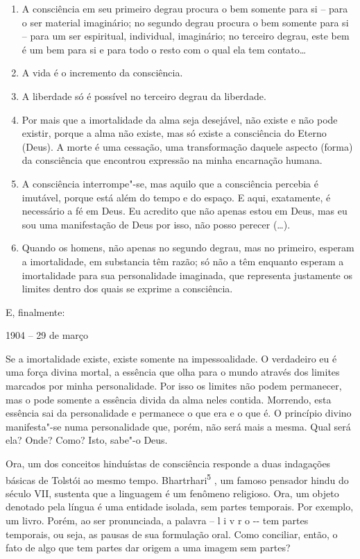 \begin{enumerate}
\def\labelenumi{\arabic{enumi})}
\item
  A consciência em seu primeiro degrau procura o bem somente para si --
  para o ser material imaginário; no segundo degrau procura o bem
  somente para si -- para um ser espiritual, individual, imaginário; no
  terceiro degrau, este bem é um bem para si e para todo o resto com o
  qual ela tem contato\ldots{}
\item
  A vida é o incremento da consciência.
\item
  A liberdade só é possível no terceiro degrau da liberdade.
\item
  Por mais que a imortalidade da alma seja desejável, não existe e não
  pode existir, porque a alma não existe, mas só existe a consciência do
  Eterno (Deus). A morte é uma cessação, uma transformação daquele
  aspecto (forma) da consciência que encontrou expressão na minha
  encarnação humana.
\item
  A consciência interrompe"-se, mas aquilo que a consciência percebia é
  imutável, porque está além do tempo e do espaço. E aqui, exatamente, é
  necessário a fé em Deus. Eu acredito que não apenas estou em Deus, mas
  eu sou uma manifestação de Deus por isso, não posso perecer (\ldots{}).
\item
  Quando os homens, não apenas no segundo degrau, mas no primeiro,
  esperam a imortalidade, em substancia têm razão; só não a têm enquanto
  esperam a imortalidade para sua personalidade imaginada, que
  representa justamente os limites dentro dos quais se exprime a
  consciência.
\end{enumerate}

E, finalmente:

1904 -- 29 de março

Se a imortalidade existe, existe somente na impessoalidade. O verdadeiro
eu é uma força divina mortal, a essência que olha para o mundo através
dos limites marcados por minha personalidade. Por isso os limites não
podem permanecer, mas o pode somente a essência divida da alma neles
contida. Morrendo, esta essência sai da personalidade e permanece o que
era e o que é. O princípio divino manifesta"-se numa personalidade que,
porém, não será mais a mesma. Qual será ela? Onde? Como? Isto, sabe"-o
Deus.

Ora, um dos conceitos hinduístas de consciência responde a duas
indagações básicas de Tolstói ao mesmo tempo.
Bhartrhari\textsuperscript{5} , um famoso pensador hindu do século VII,
sustenta que a linguagem é um fenômeno religioso. Ora, um objeto
denotado pela língua é uma entidade isolada, sem partes temporais. Por
exemplo, um livro. Porém, ao ser pronunciada, a palavra -- l i v r o
-\/- tem partes temporais, ou seja, as pausas de sua formulação oral.
Como conciliar, então, o fato de algo que tem partes dar origem a uma
imagem sem partes?

